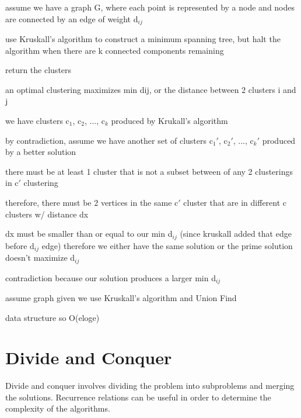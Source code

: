 \algorithm
{
    \item assume we have a graph G, where each point is represented by a node and nodes are connected by an edge of weight d$_{ij}$ 
    \item use Kruskall's algorithm to construct a minimum spanning tree, but halt the algorithm when there are k connected components remaining
    \item return the clusters 
    
}
{
    \item an optimal clustering maximizes min dij, or the distance between 2 clusters i and j
    \item we have clusters c$_{1}$, c$_{2}$, ..., c$_{k}$ produced by Krukall's algorithm
    \item by contradiction, assume we have another set of clusters c$_{1}'$, c$_{2}'$, ..., c$_{k}'$ produced by a better solution
    \item there must be at least 1 cluster that is not a subset between of any 2 clusterings in c$'$ clustering
    \item therefore, there must be 2 vertices in the same c$'$ cluster that are in different c clusters w/ distance dx
    \item dx must be smaller than or equal to our min d$_{ij}$ (since kruskall added that edge before d$_{ij}$ edge) therefore we either have the same solution or the prime solution doesn't maximize d$_{ij}$
    \item contradiction because our solution produces a larger min d$_{ij}$ 
}
{
    \item assume graph given
    we use Kruskall's algorithm and Union Find \item data structure so O(eloge)
}




\chapter{Divide and Conquer}
Divide and conquer involves dividing the problem into subproblems and merging the solutions. Recurrence relations can be useful in order to determine the complexity of the algorithms.

